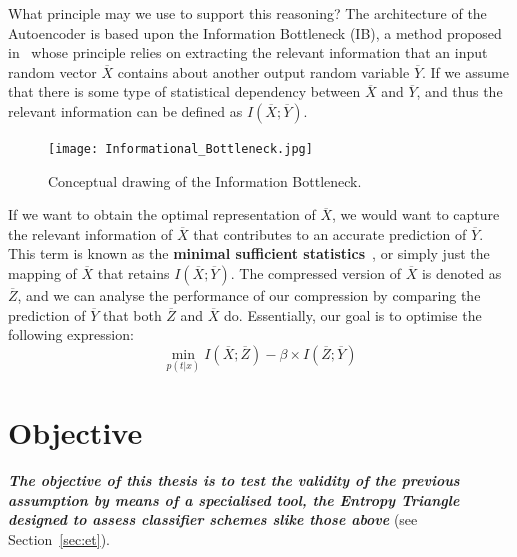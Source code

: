 What principle may we use to support this reasoning?
The architecture of the Autoencoder is based upon the  Information Bottleneck (IB), a method proposed in~\cite{Inf_Bottleneck_first} whose principle relies on extracting the relevant information that an input random vector $\overline X$ contains about another output random variable $\overline Y$. If we assume that there is some type of statistical dependency between $\overline X$ and $\overline Y$, and thus the relevant information can be defined as $I(\overline X;\overline Y)$. 
%
\begin{figure}[H]
	\centering
	\texttt{[image: Informational\_Bottleneck.jpg]}
	\caption{Conceptual drawing of the Information Bottleneck.}
	\label{fig:figure_info_bottle}
\end{figure} 

If we want to obtain the optimal representation of $\overline X$, we would want to capture the relevant information of $\overline X$ that contributes to an accurate prediction of $\overline Y$. This term is known as the \textbf{minimal sufficient statistics}~\cite{Minimal_and_Autoencoder}, or simply just the mapping of $\overline X$  that retains $I(\overline X;\overline Y)$. The compressed version of $\overline X$ is denoted as $\overline Z$, and we can analyse the performance of our compression by comparing the prediction of $\overline Y$ that both $\overline Z$ and $\overline X$ do. Essentially, our goal is to optimise the following expression: %
%
\begin{equation}
\label{eq:Bottleneck_equation}
\min\limits_{p(t|x)}  I(\overline X;\overline Z) - \beta \times I(\overline Z;\overline Y)
\end{equation} \newline



\section{Objective}

\emph{\textbf{The objective of this thesis is to test the validity of the previous assumption by means of a specialised tool, the Entropy Triangle designed to assess classifier schemes slike those above}} (see Section~\ref{sec:et}). 

